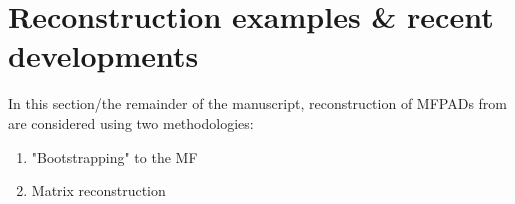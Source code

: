 \section{Reconstruction examples & recent developments}

In this section/the remainder of the manuscript, reconstruction of MFPADs from are considered using two methodologies:

\begin{enumerate}
\item "Bootstrapping" to the MF
\item Matrix reconstruction
\end{enumerate}